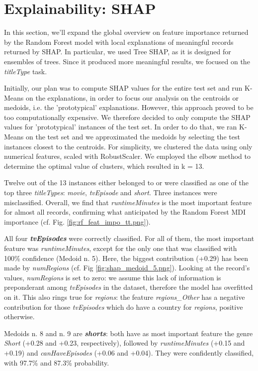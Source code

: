 \section{Explainability: SHAP}
In this section, we'll expand the global overview on feature importance returned by the Random Forest model with local explanations of meaningful records returned by SHAP. In particular, we used Tree SHAP, as it is designed for ensembles of trees. Since it produced more meaningful results, we focused on the \textit{titleType} task.

Initially, our plan was to compute SHAP values for the entire test set and run K-Means on the explanations, in order to focus our analysis on the centroids or medoids, i.e. the 'prototypical' explanations. However, this approach proved to be too computationally expensive. 
We therefore decided to only compute the SHAP values for 'prototypical' instances of the test set. In order to do that, we ran K-Means on the test set and we approximated the medoids by selecting the test instances closest to the centroids. For simplicity, we clustered the data using only numerical features, scaled with RobustScaler. We employed the elbow method to determine the optimal value of clusters, which resulted in k = 13.

Twelve out of the 13 instances either belonged to or were classified as one of the top three \textit{titleTypes}: \textit{movie}, \textit{tvEpisode} and \textit{short}. Three instances were misclassified. Overall, we find that \textit{runtimeMinutes} is the most important feature for almost all records, confirming what anticipated by the Random Forest MDI importance (cf. Fig. \ref{fig:rf_feat_impo_tt.png}).

All four \textit{\textbf{tvEpisodes}} were correctly classified. For all of them, the most important feature was \textit{runtimeMinutes}, except for the only one that was classified with 100\% confidence (Medoid n. 5). Here, the biggest contribution (+0.29) has been made by \textit{numRegions} (cf. Fig \ref{fig:shap_medoid_5.png}). Looking at the record's values, \textit{numRegions} is set to zero: we assume this lack of information is preponderant among \textit{tvEpisodes} in the dataset, therefore the model has overfitted on it. This also rings true for \textit{regions}: the feature \textit{regions\_Other} has a negative contribution for those \textit{tvEpisodes} which do have a country for \textit{regions}, positive otherwise.

Medoids n. 8 and n. 9 are \textit{\textbf{shorts}}: both have as most important feature the genre \textit{Short} (+0.28 and +0.23, respectively), followed by \textit{runtimeMinutes} (+0.15 and +0.19) and \textit{canHaveEpisodes} (+0.06 and +0.04). They were confidently classified, with 97.7\% and 87.3\% probability.

